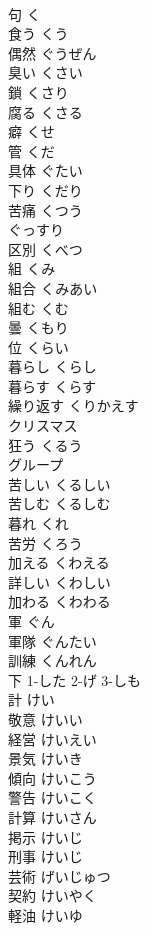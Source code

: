 \documentclass[8pt]{extreport}
\begin{document}
\begin{CJK}{UTF8}{min}
\\	句	く	
\\	食う	くう	
\\	偶然	ぐうぜん	
\\	臭い	くさい	
\\	鎖	くさり	
\\	腐る	くさる	
\\	癖	くせ	
\\	管	くだ	
\\	具体	ぐたい	
\\	下り	くだり	
\\	苦痛	くつう	
\\	ぐっすり		
\\	区別	くべつ	
\\	組	くみ	
\\	組合	くみあい	
\\	組む	くむ	
\\	曇	くもり	
\\	位	くらい	
\\	暮らし	くらし	
\\	暮らす	くらす	
\\	繰り返す	くりかえす	
\\	クリスマス		
\\	狂う	くるう	
\\	グループ		
\\	苦しい	くるしい	
\\	苦しむ	くるしむ	
\\	暮れ	くれ	
\\	苦労	くろう	
\\	加える	くわえる	
\\	詳しい	くわしい	
\\	加わる	くわわる	
\\	軍	ぐん	
\\	軍隊	ぐんたい	
\\	訓練	くんれん	
\\	下	1-した 2-げ 3-しも	
\\	計	けい	
\\	敬意	けいい	
\\	経営	けいえい	
\\	景気	けいき	
\\	傾向	けいこう	
\\	警告	けいこく	
\\	計算	けいさん	
\\	掲示	けいじ	
\\	刑事	けいじ	
\\	芸術	げいじゅつ	
\\	契約	けいやく	
\\	軽油	けいゆ	

\end{CJK}
\end{document}
